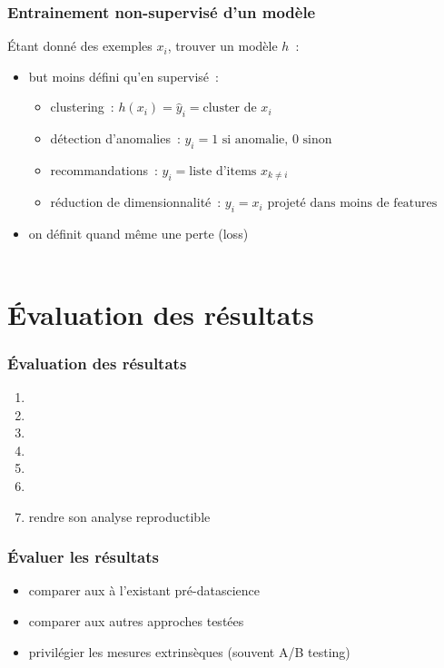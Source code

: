 \documentclass{formation}
\begin{document}
\begin{frame}
  \frametitle{Entrainement non-supervisé d'un modèle}
  Étant donné des exemples $x_i$, trouver un modèle $h$ :
  \begin{itemize}[<+->]
  \item but moins défini qu'en supervisé :
    \begin{itemize}[<+->]
    \item clustering : $h(x_i) = \hat{y}_i = \text{cluster de }x_i$
    \item détection d'anomalies : $y_i = 1 \text{ si anomalie, }0
      \text{ sinon}$
    \item recommandations : $y_i = \text{liste d'items }x_{k\neq i}$
    \item réduction de dimensionnalité : $y_i = x_i \text{ projeté dans
      moins de features}$
    \end{itemize}
  \item on définit quand même une perte (loss) \\[.2cm]
    \\[.2cm]
  \end{itemize}
\end{frame}

\section{Évaluation des résultats}

\begin{frame}
  \frametitle{Évaluation des résultats}

  \begin{enumerate}
  \item {}
  \item {}
  \item {}
  \item {}
  \item {}
  \item {}
  \item rendre son analyse reproductible
  \end{enumerate}
\end{frame}

\begin{frame}
  \frametitle{Évaluer les résultats}

  \begin{itemize}
  \item comparer aux à l'existant pré-datascience
  \item comparer aux autres approches testées
  \item privilégier les mesures extrinsèques (souvent A/B testing)
  \end{itemize}
\end{frame}
\end{document}
